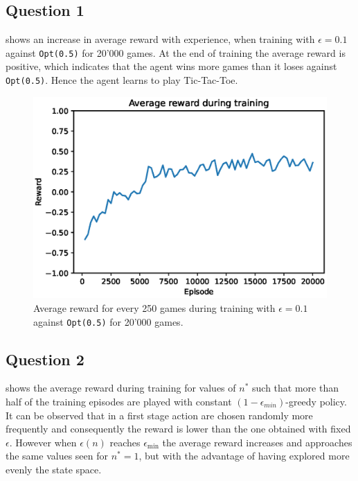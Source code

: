 \documentclass[10pt]{IEEEtran}
\begin{document}
\subsection*{Question 1}
 shows an increase in average reward with experience, when training with $\epsilon = 0.1$ against \texttt{Opt(0.5)} for 20'000 games. At the end of training the average reward is positive, which indicates that the agent wins more games than it loses against \texttt{Opt(0.5)}. Hence the agent learns to play Tic-Tac-Toe. 
\begin{figure}[H]
    \centering
    \includegraphics[width = 0.85\linewidth]{code/figures/rewards_Q1.eps}
    \caption{Average reward for every 250 games during training with $\epsilon = 0.1$ against \texttt{Opt(0.5)} for 20'000 games.}
    \label{plot_question1}
\end{figure}

\subsection*{Question 2}
 shows the average reward during training for values of $n^{*}$ such that more than half of the training episodes are played with constant $(1-\epsilon_{min})$-greedy policy. It can be observed that in a first stage action are chosen randomly more frequently and consequently the reward is lower than the one obtained with fixed $\epsilon$. However when $\epsilon(n)$ reaches $\epsilon_{\text{min}}$ the average reward increases and approaches the same values seen for $n^{*} = 1$, but with the advantage of having explored more evenly the state space. 
\end{document}
